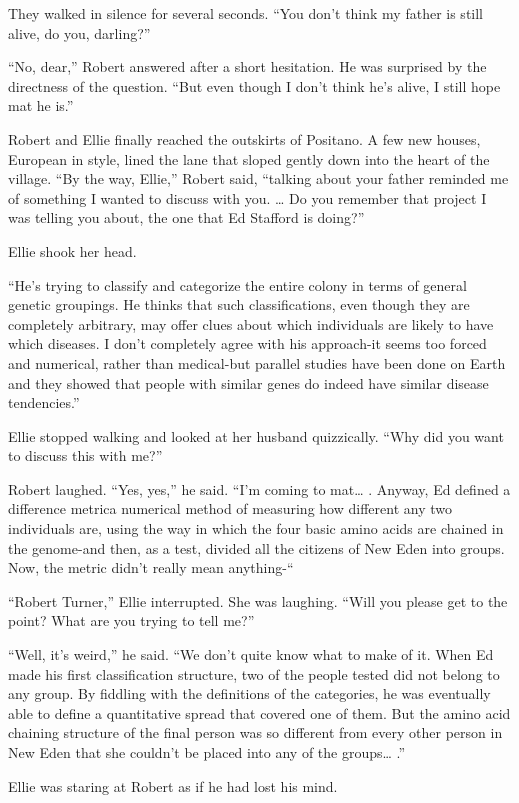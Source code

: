 \documentclass[]{article}
\begin{document}
{{They walked in silence for several seconds. “You don’t think my father is still alive, do you, darling?”

“No, dear,” Robert answered after a short hesitation. He was surprised by the directness of the question. “But even though I don’t think he’s alive, I still hope mat he is.”

Robert and Ellie finally reached the outskirts of Positano. A few new houses, European in style, lined the lane that sloped gently down into the heart of the village. “By the way, Ellie,” Robert said, “talking about your father reminded me of something I wanted to discuss with you. … Do you remember that project I was telling you about, the one that Ed Stafford is doing?”

Ellie shook her head.

“He’s trying to classify and categorize the entire colony in terms of general genetic groupings. He thinks that such classifications, even though they are completely arbitrary, may offer clues about which individuals are likely to have which diseases. I don’t completely agree with his approach-it seems too forced and numerical, rather than medical-but parallel studies have been done on Earth and they showed that people with similar genes do indeed have similar disease tendencies.”

Ellie stopped walking and looked at her husband quizzically. “Why did you want to discuss this with me?”

Robert laughed. “Yes, yes,” he said. “I’m coming to mat… . Anyway, Ed defined a difference metrica numerical method of measuring how different any two individuals are, using the way in which the four basic amino acids are chained in the genome-and then, as a test, divided all the citizens of New Eden into groups. Now, the metric didn’t really mean anything-“

“Robert Turner,” Ellie interrupted. She was laughing. “Will you please get to the point? What are you trying to tell me?”

“Well, it’s weird,” he said. “We don’t quite know what to make of it. When Ed made his first classification structure, two of the people tested did not belong to any group. By fiddling with the definitions of the categories, he was eventually able to define a quantitative spread that covered one of them. But the amino acid chaining structure of the final person was so different from every other person in New Eden that she couldn’t be placed into any of the groups… .”

Ellie was staring at Robert as if he had lost his mind.

}}
\end{document}

